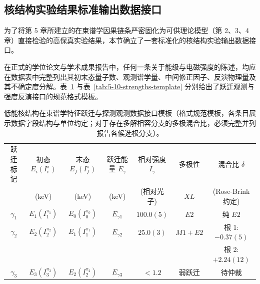 \subsection{核结构实验结果标准输出数据接口}\label{subsec:5-10-5}

为了将第 5 章所建立的在束谱学因果链条严密固化为可供理论模型（第 2、3、4 章）直接检验的高保真实验结果，本节确立了一套标准化的核结构实验输出数据接口。

在正式的学位论文与学术成果报告中，任何一条关于能级与电磁强度的陈述，均应在数据表中完整列出其初末态量子数、观测谱学量、中间修正因子、反演物理量及其不确定度分解。表~\ref{tab:5-10-transitions-template} 与表~\ref{tab:5-10-strengths-template} 分别给出了跃迁观测与强度反演接口的规范格式模板。

\begin{table}[!htbp]
\centering\footnotesize
\caption{低能核结构在束谱学特征跃迁与探测观测数据接口模板（格式规范模板，各条目展示数据字段结构与单位约定；对于存在多解相容分支的多极混合比，必须完整并列报告各候选根分支）。}
\label{tab:5-10-transitions-template}
\begin{tabular*}{\textwidth}{@{\extracolsep{\fill}}ccccccc@{}}
\toprule
跃迁标记 & 初态 $E_i (I_i^{\pi})$ & 末态 $E_f (I_f^{\pi})$ & 跃迁能量 $E_\gamma$ & 相对强度 $I_\gamma$ & 多极性 & 混合比 $\delta$ \\
& (keV) & (keV) & (keV) & (相对光子) & $XL$ & (Rose-Brink 约定) \\
\midrule
$\gamma_1$ & $E_1 (I_1^{\pi_1})$ & $E_0 (I_0^{\pi_0})$ & $E_{\gamma 1}$ & $100.0(5)$ & $E2$ & 纯 $E2$ \\
$\gamma_2$ & $E_2 (I_2^{\pi_2})$ & $E_1 (I_1^{\pi_1})$ & $E_{\gamma 2}$ & $25.0(3)$ & $M1+E2$ & 根 1: $-0.37(5)$ \\
& & & & & & 根 2: $+2.24(12)$ \\
$\gamma_3$ & $E_3 (I_3^{\pi_3})$ & $E_2 (I_2^{\pi_2})$ & $E_{\gamma 3}$ & $< 1.2$ & 弱跃迁 & 待仲裁 \\
\bottomrule
\end{tabular*}
\end{table}

